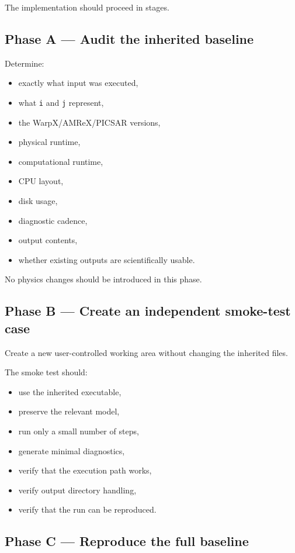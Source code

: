 \documentclass[11pt,a4paper]{article}
\begin{document}
The implementation should proceed in stages.

\subsection{Phase A --- Audit the inherited baseline}

Determine:

\begin{itemize}
    \item exactly what input was executed,
    \item what \texttt{i} and \texttt{j} represent,
    \item the WarpX/AMReX/PICSAR versions,
    \item physical runtime,
    \item computational runtime,
    \item CPU layout,
    \item disk usage,
    \item diagnostic cadence,
    \item output contents,
    \item whether existing outputs are scientifically usable.
\end{itemize}

No physics changes should be introduced in this phase.

\subsection{Phase B --- Create an independent smoke-test case}

Create a new user-controlled working area without changing the inherited files.

The smoke test should:

\begin{itemize}
    \item use the inherited executable,
    \item preserve the relevant model,
    \item run only a small number of steps,
    \item generate minimal diagnostics,
    \item verify that the execution path works,
    \item verify output directory handling,
    \item verify that the run can be reproduced.
\end{itemize}

\subsection{Phase C --- Reproduce the full baseline}
\end{document}
